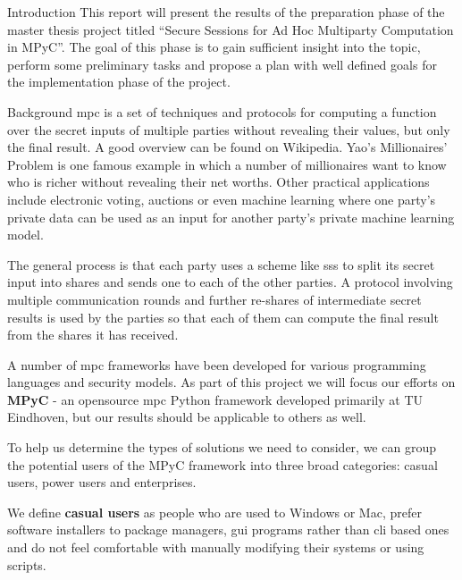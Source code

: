 \begin{frame}{Introduction}
\protect\hypertarget{introduction}{}
This report will present the results of the preparation phase of the
master thesis project titled ``Secure Sessions for Ad Hoc Multiparty
Computation in MPyC''. The goal of this phase is to gain sufficient
insight into the topic, perform some preliminary tasks and propose a
plan with well defined goals for the implementation phase of the
project.

\begin{block}{Background}
\protect\hypertarget{background}{}
\gls{mpc} is a set of techniques and protocols for computing a function
over the secret inputs of multiple parties without revealing their
values, but only the final result. A good overview can be found on
Wikipedia\autocite{wikiMPC}. Yao's Millionaires'
Problem\autocite{yaoProtocolsSecureComputations1982} is one famous
example in which a number of millionaires want to know who is richer
without revealing their net worths. Other practical
applications\autocite{laudApplicationsSecureMultiparty2015} include
electronic voting, auctions or even machine
learning\autocite{knottCrypTenSecureMultiParty2022} where one party's
private data can be used as an input for another party's private machine
learning model.

The general process is that each party uses a scheme like \gls{sss}
\autocite{shamirHowShareSecret1979} to split its secret input into
shares and sends one to each of the other parties. A protocol involving
multiple communication rounds and further re-shares of intermediate
secret results is used by the parties so that each of them can compute
the final result from the shares it has received.

A number of \gls{mpc} frameworks have been developed for various
programming languages and security models. As part of this project we
will focus our efforts on \textbf{MPyC}\autocite{mpycHome,mpycSource} -
an opensource \gls{mpc} Python framework developed primarily at TU
Eindhoven, but our results should be applicable to others as well.

To help us determine the types of solutions we need to consider, we can
group the potential users of the MPyC framework into three broad
categories: casual users, power users and enterprises.

We define \textbf{casual users} as people who are used to Windows or
Mac, prefer software installers to package managers, \gls{gui} programs
rather than \gls{cli} based ones and do not feel comfortable with
manually modifying their systems or using scripts.


\end{block}
\end{frame}
